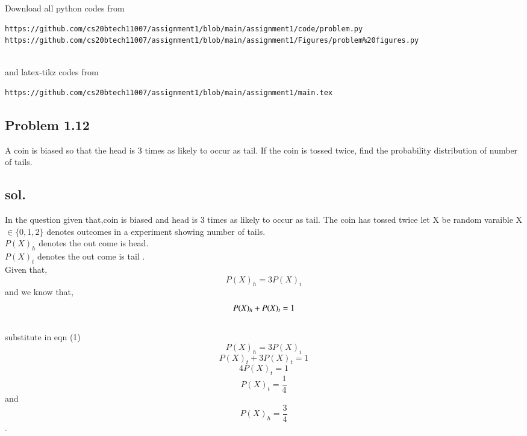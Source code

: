 \documentclass[journal,14pt,twocolumn]{IEEEtran}
\begin{document}
\maketitle
\newpage
\bigskip
\renewcommand{\thefigure}{\theenumi}
\renewcommand{\thetable}{\theenumi}
Download all python codes from 
\begin{lstlisting}
https://github.com/cs20btech11007/assignment1/blob/main/assignment1/code/problem.py
https://github.com/cs20btech11007/assignment1/blob/main/assignment1/Figures/problem%20figures.py


\end{lstlisting}
%
and latex-tikz codes from 
%
\begin{lstlisting}
https://github.com/cs20btech11007/assignment1/blob/main/assignment1/main.tex

\end{lstlisting}
\begin{center}
\section*{Problem 1.12}
\end{center}
A coin is biased so that the head is 3 times
as likely to occur as tail. If the coin is tossed
twice, find the probability distribution of
number of tails.\\

\subsection*{sol.}
 In the question given that,coin is biased and head is 3 times as likely to occur as tail.
The coin has tossed twice 
let X be random varaible X$\in\{0,1,2 \}$ denotes outcomes  in a experiment showing number of tails.\\
$P(X)_h$   denotes the out come is head.\\
$P(X)_t$    denotes the out come is tail .\\
Given that,$$P(X)_h=3P(X)_i$$
and we know that,
\begin{equation}
 P(X)_{h} +P(X)_{t}=1\\
\end{equation}\\

substitute in eqn (1)$$P(X)_h=3P(X)_i $$ 
$$P(X)_t+3P(X)_t=1$$
$$4P(X)_t=1$$
$$ P(X)_t=\frac{1}{4}$$
and $$P(X)_h=\frac{3}{4}$$.\\
\begin{table}[h]
\\
\caption{Outcome of the Experiment} 

\end{table}
\end{document}
